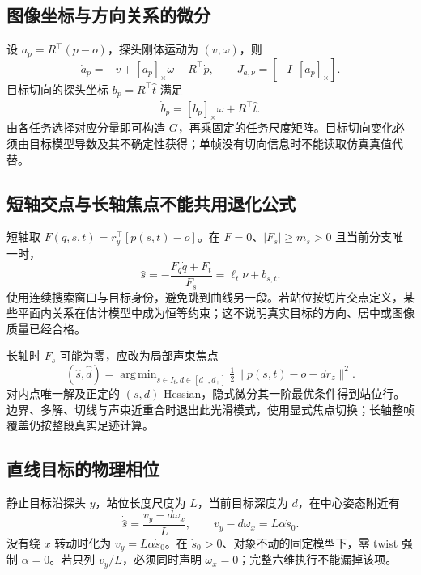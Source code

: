\documentclass[UTF8,11pt,a4paper,fontset=fandol]{ctexart}
\numberwithin{equation}{section}
\theoremstyle{definition}
\DeclareMathOperator{\argmin}{arg\,min}
\begin{document}
\subsection{图像坐标与方向关系的微分}
设 $a_p=R^\top(p-o)$，探头刚体运动为 $(v,\omega)$，则
\begin{equation}
\dot a_p=-v+[a_p]_\times\omega+R^\top\dot p,
\qquad
J_{a,\nu}=[-I\ \ [a_p]_\times].
\label{eq:imagejacappend}
\end{equation}
目标切向的探头坐标 $b_p=R^\top\widehat t$ 满足
\begin{equation}
\dot b_p=[b_p]_\times\omega+R^\top\dot{\widehat t}.
\end{equation}
由各任务选择对应分量即可构造 $G$，再乘固定的任务尺度矩阵。目标切向变化必须由目标模型导数及其不确定性获得；单帧没有切向信息时不能读取仿真真值代替。

\subsection{短轴交点与长轴焦点不能共用退化公式}
短轴取 $F(q,s,t)=r_y^\top[p(s,t)-o]$。在 $F=0$、$|F_s|\ge m_s>0$ 且当前分支唯一时，
\begin{equation}
\dot{\widehat s}=-\frac{F_q\dot q+F_t}{F_s}=\ell_t\nu+b_{s,t}.
\label{eq:implicitstation}
\end{equation}
使用连续搜索窗口与目标身份，避免跳到曲线另一段。若站位按切片交点定义，某些平面内关系在估计模型中成为恒等约束；这不说明真实目标的方向、居中或图像质量已经合格。

长轴时 $F_s$ 可能为零，应改为局部声束焦点
\begin{equation}
(\widehat s,\widehat d)=\argmin_{s\in I_t,d\in[d_-,d_+]}
\tfrac12\|p(s,t)-o-d r_z\|^2.
\label{eq:longstation}
\end{equation}
对内点唯一解及正定的 $(s,d)$ Hessian，隐式微分其一阶最优条件得到站位行。边界、多解、切线与声束近重合时退出此光滑模式，使用显式焦点切换；长轴整帧覆盖仍按整段真实足迹计算。

\subsection{直线目标的物理相位}
静止目标沿探头 $y$，站位长度尺度为 $L$，当前目标深度为 $d$，在中心姿态附近有
\begin{equation}
\dot{\widehat s}=\frac{v_y-d\omega_x}{L},\qquad
v_y-d\omega_x=L\alpha\dot s_0.
\label{eq:straightphase}
\end{equation}
没有绕 $x$ 转动时化为 $v_y=L\alpha\dot s_0$。在 $\dot s_0>0$、对象不动的固定模型下，零 twist 强制 $\alpha=0$。若只列 $v_y/L$，必须同时声明 $\omega_x=0$；完整六维执行不能漏掉该项。
\end{document}
